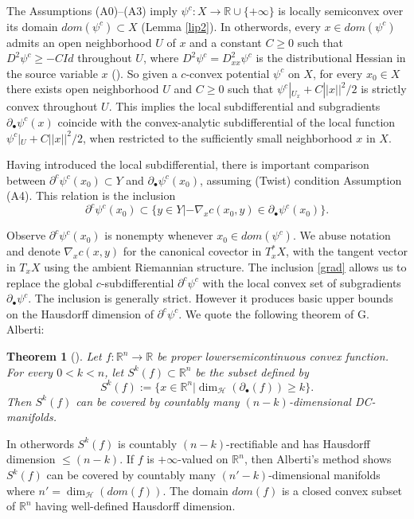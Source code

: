 \documentclass[12pt]{amsart}
\newtheorem{thm}{Theorem}
\theoremstyle{definition}
\theoremstyle{remark}
\newcommand{\bR}{\mathbb{R}}
\newcommand{\del}{\partial}
\begin{document}
The Assumptions (A0)--(A3) imply $\psi^c: X\to \bR \cup \{+\infty\}$ is locally semiconvex over its domain $dom(\psi^c) \subset X$ (Lemma \ref{lip2}). In otherwords, every $x\in dom(\psi^c)$ admits an open neighborhood $U$ of $x$ and a constant $C\geq 0$ such that $D^2 \psi^c \geq -C Id$ throughout $U$, where $D^2\psi^c=D^2_{xx} \psi^c$ is the distributional Hessian in the source variable $x$ (\cite[Theorem 14.1, pp.363]{Vil1}). So given a $c$-convex potential $\psi^c$ on $X$, for every $x_0\in X$ there exists open neighborhood $U$ and $C\geq 0$ such that $\psi^c |_{U_x} + C ||x||^2/2$ is strictly convex throughout $U$. This implies the local subdifferential and subgradients $\del_\bullet \psi^c(x)$ coincide with the convex-analytic subdifferential of the local function $\psi^c|_U+C||x||^2/2$, when restricted to the sufficiently small neighborhood $x$ in $X$. 


Having introduced the local subdifferential, there is important comparison between $\del^c \psi^c (x_0) \subset Y$ and $\del_\bullet \psi^c(x_0)$, assuming (Twist) condition Assumption (A4). This relation is the inclusion
\begin{equation} \del^c \psi^c (x_0) \subset \{y\in Y | -\nabla_x c(x_0,y) \in \del_\bullet \psi^c (x_0)\}. \label{grad}\end{equation} 

Observe $\del^c \psi^c (x_0)$ is nonempty whenever $x_0\in dom(\psi^c)$. We abuse notation and  denote $\nabla_x c(x,y)$ for the canonical covector in $T_x^* X$, with the tangent vector in $T_xX$ using the ambient Riemannian structure. The inclusion \eqref{grad} allows us to replace the global $c$-subdifferential $\del^c \psi^c$ with the local convex set of subgradients $\del_\bullet \psi^c$. The inclusion is generally strict. However it produces basic upper bounds on the Hausdorff dimension of $\del^c \psi^c$. We quote the following theorem of G. Alberti: 
\begin{thm}[\cite{Alberti}]\label{alb}
Let $f: \bR^n \to \bR$ be proper lowersemicontinuous convex function. For every $0<k<n$, let $S^k(f) \subset \bR^n$ be the subset defined by $$S^k(f):=\{x\in \bR^n| \dim_{ \mathscr{H}} (\del_\bullet (f)) \geq k\}.$$ Then $S^k(f)$ can be covered by countably many $(n-k)$-dimensional DC-manifolds.
\end{thm} 
In otherwords $S^k(f)$ is countably $(n-k)$-rectifiable and has Hausdorff dimension $\leq (n-k)$. If $f$ is $+\infty$-valued on $\bR^n$, then Alberti's method shows $S^k(f)$ can be covered by countably many $(n'-k)$-dimensional manifolds where $n'=\dim_{\mathscr{H}}( dom(f))$. The domain $dom(f)$ is a closed convex subset of $\bR^n$ having well-defined Hausdorff dimension.
\end{document}
